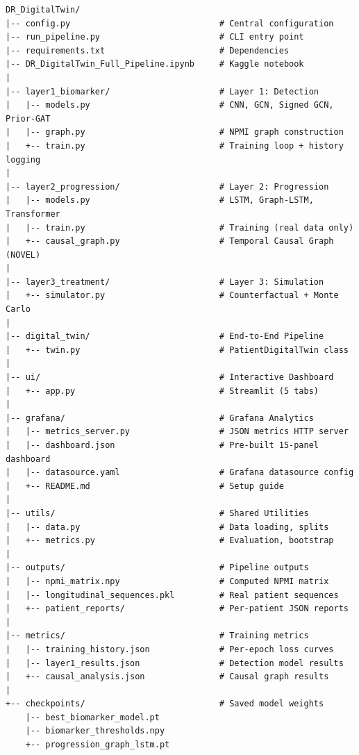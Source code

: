 \documentclass[12pt,a4paper]{article}
\begin{document}
\begin{lstlisting}
DR_DigitalTwin/
|-- config.py                              # Central configuration
|-- run_pipeline.py                        # CLI entry point
|-- requirements.txt                       # Dependencies
|-- DR_DigitalTwin_Full_Pipeline.ipynb     # Kaggle notebook
|
|-- layer1_biomarker/                      # Layer 1: Detection
|   |-- models.py                          # CNN, GCN, Signed GCN, Prior-GAT
|   |-- graph.py                           # NPMI graph construction
|   +-- train.py                           # Training loop + history logging
|
|-- layer2_progression/                    # Layer 2: Progression
|   |-- models.py                          # LSTM, Graph-LSTM, Transformer
|   |-- train.py                           # Training (real data only)
|   +-- causal_graph.py                    # Temporal Causal Graph (NOVEL)
|
|-- layer3_treatment/                      # Layer 3: Simulation
|   +-- simulator.py                       # Counterfactual + Monte Carlo
|
|-- digital_twin/                          # End-to-End Pipeline
|   +-- twin.py                            # PatientDigitalTwin class
|
|-- ui/                                    # Interactive Dashboard
|   +-- app.py                             # Streamlit (5 tabs)
|
|-- grafana/                               # Grafana Analytics
|   |-- metrics_server.py                  # JSON metrics HTTP server
|   |-- dashboard.json                     # Pre-built 15-panel dashboard
|   |-- datasource.yaml                    # Grafana datasource config
|   +-- README.md                          # Setup guide
|
|-- utils/                                 # Shared Utilities
|   |-- data.py                            # Data loading, splits
|   +-- metrics.py                         # Evaluation, bootstrap
|
|-- outputs/                               # Pipeline outputs
|   |-- npmi_matrix.npy                    # Computed NPMI matrix
|   |-- longitudinal_sequences.pkl         # Real patient sequences
|   +-- patient_reports/                   # Per-patient JSON reports
|
|-- metrics/                               # Training metrics
|   |-- training_history.json              # Per-epoch loss curves
|   |-- layer1_results.json                # Detection model results
|   +-- causal_analysis.json               # Causal graph results
|
+-- checkpoints/                           # Saved model weights
    |-- best_biomarker_model.pt
    |-- biomarker_thresholds.npy
    +-- progression_graph_lstm.pt
\end{lstlisting}
\end{document}
